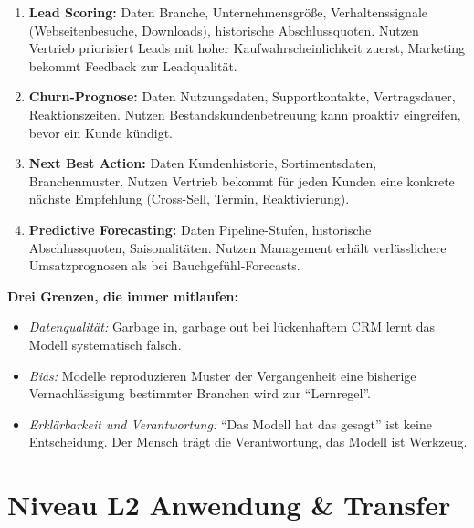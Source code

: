 \documentclass[11pt,a4paper,oneside]{article}
\begin{document}
\begin{loesungbox}
\begin{enumerate}
  \item \textbf{Lead Scoring:} Daten \textendash{} Branche, Unternehmensgröße, Verhaltenssignale (Webseitenbesuche, Downloads), historische Abschlussquoten. Nutzen \textendash{} Vertrieb priorisiert Leads mit hoher Kaufwahrscheinlichkeit zuerst, Marketing bekommt Feedback zur Leadqualität.
  \item \textbf{Churn-Prognose:} Daten \textendash{} Nutzungsdaten, Supportkontakte, Vertragsdauer, Reaktionszeiten. Nutzen \textendash{} Bestandskundenbetreuung kann proaktiv eingreifen, bevor ein Kunde kündigt.
  \item \textbf{Next Best Action:} Daten \textendash{} Kundenhistorie, Sortimentsdaten, Branchenmuster. Nutzen \textendash{} Vertrieb bekommt für jeden Kunden eine konkrete nächste Empfehlung (Cross-Sell, Termin, Reaktivierung).
  \item \textbf{Predictive Forecasting:} Daten \textendash{} Pipeline-Stufen, historische Abschlussquoten, Saisonalitäten. Nutzen \textendash{} Management erhält verlässlichere Umsatzprognosen als bei Bauchgefühl-Forecasts.
\end{enumerate}

\smallskip
\textbf{Drei Grenzen, die immer mitlaufen:}
\begin{itemize}
  \item \emph{Datenqualität:} Garbage in, garbage out \textendash{} bei lückenhaftem CRM lernt das Modell systematisch falsch.
  \item \emph{Bias:} Modelle reproduzieren Muster der Vergangenheit \textendash{} eine bisherige Vernachlässigung bestimmter Branchen wird zur ``Lernregel''.
  \item \emph{Erklärbarkeit und Verantwortung:} ``Das Modell hat das gesagt'' ist keine Entscheidung. Der Mensch trägt die Verantwortung, das Modell ist Werkzeug.
\end{itemize}
\end{loesungbox}

\clearpage

\section*{Niveau L2 \textendash{} Anwendung \& Transfer}
\end{document}
